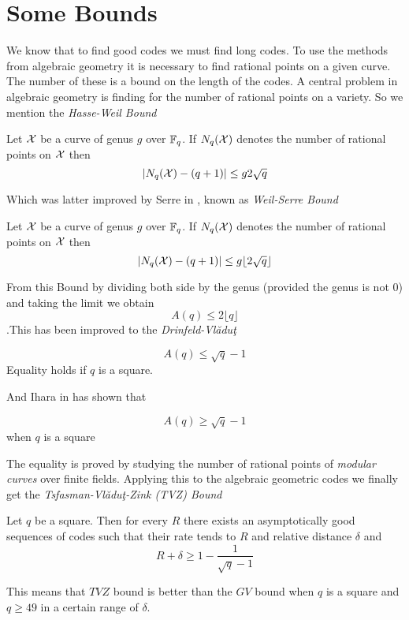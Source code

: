 \section{Some Bounds}
We know that to find good codes we must find long codes. To use the methods from algebraic geometry it is necessary to find rational points on a given curve. The number of these is a bound on the length of the codes. A central problem in algebraic geometry is finding for the number of rational points on a variety. So we mention the \textit{Hasse-Weil Bound}
\begin{theorem}
	Let $\mathcal{X}$ be a curve of genus $g$ over $\mathbb{F}_q$. If $N_q(\mathcal{X})$ denotes the number of rational points on $\mathcal{X}$ then $$|N_q(\mathcal{X})-(q+1)|\leq g 2\sqrt{q}$$
\end{theorem}
Which was latter improved by Serre in \cite{weilserre}, known as \textit{Weil-Serre Bound}
\begin{theorem}
	Let $\mathcal{X}$ be a curve of genus $g$ over $\mathbb{F}_q$. If $N_q(\mathcal{X})$ denotes the number of rational points on $\mathcal{X}$ then $$|N_q(\mathcal{X})-(q+1)|\leq g\lfloor 2\sqrt{q}\rfloor$$
\end{theorem}
From this Bound by dividing both side by the genus (provided the genus is not 0) and taking the limit we obtain $$A(q)\leq 2\lfloor q\rfloor$$.This has been improved to the \textit{Drinfeld-Vl\u{a}du\c{t}}
\begin{theorem}
	$$A(q)\leq \sqrt{q}-1$$Equality holds if $q$ is a square.
\end{theorem}
And Ihara in \cite{Ihara} has shown that 
\begin{theorem}
	$$A(q)\geq \sqrt{q}-1$$ when $q$ is a square
\end{theorem}
The equality is proved by studying the number of rational points of \textit{modular curves} over finite fields. Applying this to the algebraic geometric codes we finally get the \textit{Tsfasman-Vl\u{a}du\c{t}-Zink (TVZ) Bound}
\begin{theorem}
	Let $q$ be a square. Then for every $R$ there exists an asymptotically good sequences of codes such that their rate tends to $R$ and relative distance $\delta$ and $$R+\delta\geq 1-\frac1{\sqrt{q}-1}$$
\end{theorem} 
This means that $TVZ$ bound is better than the $GV$ bound when $q$ is a square and $q\geq 49$ in a certain range of $\delta$.

